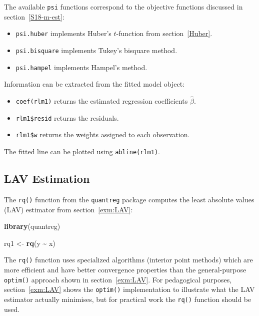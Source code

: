 \documentclass[
  a4paper,
]{article}
\newenvironment{Shaded}{\begin{snugshade}}{\end{snugshade}}
\newcommand{\FunctionTok}[1]{\textcolor[rgb]{0.13,0.29,0.53}{\textbf{#1}}}
\newcommand{\NormalTok}[1]{#1}
\newcommand{\OtherTok}[1]{\textcolor[rgb]{0.56,0.35,0.01}{#1}}
\newcommand{\SpecialCharTok}[1]{\textcolor[rgb]{0.81,0.36,0.00}{\textbf{#1}}}
\providecommand{\tightlist}{%
  \setlength{\itemsep}{0pt}\setlength{\parskip}{0pt}}
\theoremstyle{definition}
\theoremstyle{definition}
\theoremstyle{definition}
\theoremstyle{definition}
\theoremstyle{remark}
\begin{document}
The available \texttt{psi} functions correspond to the objective functions discussed
in section~\ref{S18-m-est}:

\begin{itemize}
\tightlist
\item
  \texttt{psi.huber} implements Huber's \(t\)-function from section~\ref{Huber}.
\item
  \texttt{psi.bisquare} implements Tukey's bisquare method.
\item
  \texttt{psi.hampel} implements Hampel's method.
\end{itemize}

Information can be extracted from the fitted model object:

\begin{itemize}
\tightlist
\item
  \texttt{coef(rlm1)} returns the estimated regression coefficients \(\hat\beta\).
\item
  \texttt{rlm1\$resid} returns the residuals.
\item
  \texttt{rlm1\$w} returns the weights assigned to each observation.
\end{itemize}

The fitted line can be plotted using \texttt{abline(rlm1)}.

\subsection*{LAV Estimation}\label{lav-estimation}

The \texttt{rq()} function from the \texttt{quantreg} package computes the least absolute
values (LAV) estimator from section~\ref{exm:LAV}:

\begin{Shaded}
\begin{Highlighting}[]
\FunctionTok{library}\NormalTok{(quantreg)}

\NormalTok{rq1 }\OtherTok{\textless{}{-}} \FunctionTok{rq}\NormalTok{(y }\SpecialCharTok{\textasciitilde{}}\NormalTok{ x)}
\end{Highlighting}
\end{Shaded}

The \texttt{rq()} function uses specialized algorithms (interior point methods) which
are more efficient and have better convergence properties than the
general-purpose \texttt{optim()} approach shown in section~\ref{exm:LAV}. For
pedagogical purposes, section~\ref{exm:LAV} shows the \texttt{optim()}
implementation to illustrate what the LAV estimator actually minimises, but for
practical work the \texttt{rq()} function should be used.
\end{document}
